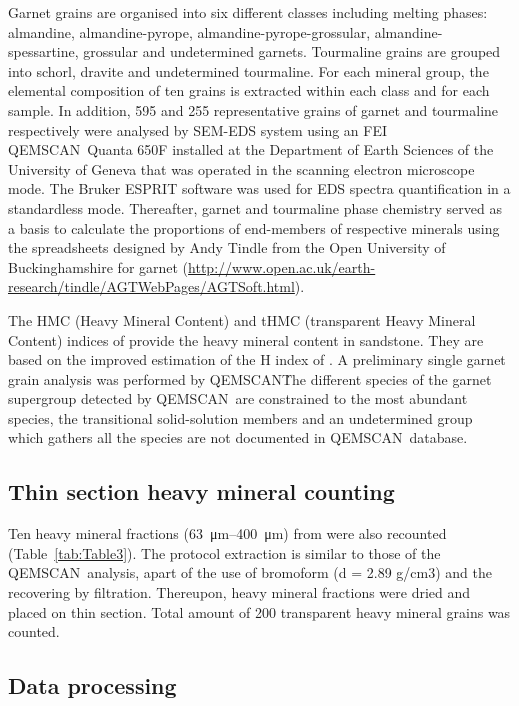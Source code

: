 \documentclass[twoside]{article}
\newcommand\registred{\textsuperscript{\tiny\textregistered}}
\begin{document}
Garnet grains are organised into six different classes including melting phases: almandine, almandine-pyrope, almandine-pyrope-grossular, almandine-spessartine, grossular and undetermined garnets. Tourmaline grains are grouped into schorl, dravite and undetermined tourmaline. For each mineral group, the elemental composition of ten grains is extracted within each class and for each sample.
In addition, 595 and 255 representative grains of garnet and tourmaline respectively were analysed by SEM-EDS system using an FEI QEMSCAN\registred\ Quanta 650F installed at the Department of Earth Sciences of the University of Geneva that was operated in the scanning electron microscope mode. The Bruker ESPRIT software was used for EDS spectra quantification in a standardless mode. Thereafter, garnet and tourmaline phase chemistry served as a basis to calculate the proportions of end-members of respective minerals using the spreadsheets designed by Andy Tindle from the Open University of Buckinghamshire for garnet (\url{http://www.open.ac.uk/earth-research/tindle/AGTWebPages/AGTSoft.html}).\par
\medskip
The HMC (Heavy Mineral Content) and tHMC (transparent Heavy Mineral Content) indices of \cite{Garzanti2007a} provide the heavy mineral content in sandstone. They are based on the improved estimation of the H index of \cite{Baker1962}. A preliminary single garnet grain analysis was performed by QEMSCAN\registred\. The different species of the garnet supergroup \cite{Grew2013} detected by QEMSCAN\registred\ are constrained to the most abundant species, the transitional solid-solution members and an undetermined group which gathers all the species are not documented in QEMSCAN\registred\ database.

\subsection{Thin section heavy mineral counting}

Ten heavy mineral fractions (\SIrange{63}{400}{\micro\meter}) from \cite{Ragusa2009} were also recounted (Table~\ref{tab:Table3}). The protocol extraction is similar to those of the QEMSCAN\registred\ analysis, apart of the use of bromoform (d = 2.89 g/cm3) and the recovering by filtration. Thereupon, heavy mineral fractions were dried and placed on thin section. Total amount of 200 transparent heavy mineral grains was counted.

\subsection{Data processing}
\end{document}
